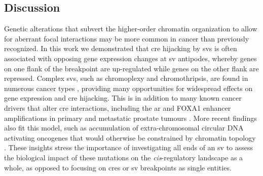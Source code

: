 \subsection{Discussion}

Genetic alterations that subvert the higher-order chromatin organization to allow for aberrant focal interactions may be more common in cancer than previously recognized.
In this work we demonstrated that \gls{cre} hijacking by \glspl{sv} is often associated with opposing gene expression changes at \gls{sv} antipodes, whereby genes on one flank of the breakpoint are up-regulated while genes on the other flank are repressed.
Complex \glspl{sv}, such as chromoplexy and chromothripsis, are found in numerous cancer types \cite{bacaPunctuatedEvolutionProstate2013,liPatternsSomaticStructural2020}, providing many opportunities for widespread effects on gene expression and \gls{cre} hijacking.
This is in addition to many known cancer drivers that alter \gls{cre} interactions, including the \gls{ar} and FOXA1 enhancer amplifications in primary and metastatic prostate tumours \cite{paroliaDistinctStructuralClasses2019,quigleyGenomicHallmarksStructural2018,takedaSomaticallyAcquiredEnhancer2018,zhouNoncodingMutationsTarget2020,kronTMPRSS2ERGFusion2017,viswanathanStructuralAlterationsDriving2018}.
More recent findings also fit this model, such as accumulation of extra-chromosomal circular DNA activating oncogenes that would otherwise be constrained by chromatin topology \cite{wuCircularEcDNAPromotes2019,kumarATACseqIdentifiesThousands2020,mortonFunctionalEnhancersShape2019,shoshaniChromothripsisDrivesEvolution2021}.
These insights stress the importance of investigating all ends of an \gls{sv} to assess the biological impact of these mutations on the \emph{cis}-regulatory landscape as a whole, as opposed to focusing on \glspl{cre} or \gls{sv} breakpoints as single entities.


